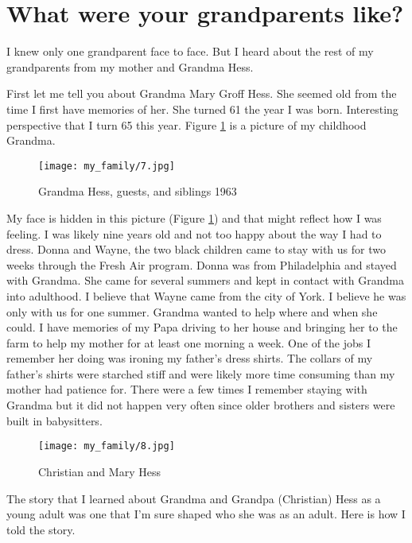 \section{What were your grandparents like?}
I knew only one grandparent face to face.
But I heard about the rest of my grandparents from my mother and Grandma Hess.

First let me tell you about Grandma Mary Groff Hess.
She seemed old from the time I first have memories of her.
She turned 61 the year I was born.
Interesting perspective that I turn 65 this year.
Figure \ref{grandma-hess} is a picture of my childhood Grandma.
\begin{figure}[h!]
\centering
\texttt{[image: my\_family/7.jpg]}
\caption{Grandma Hess, guests, and siblings 1963}
\label{grandma-hess}
\end{figure}

My face is hidden in this picture (Figure \ref{grandma-hess}) and that might reflect how I was feeling.
I was likely nine years old and not too happy about the way I had to dress.
Donna and Wayne, the two black children came to stay with us for two weeks through the Fresh Air program.
Donna was from Philadelphia and stayed with Grandma.
She came for several summers and kept in contact with Grandma into adulthood.
I believe that Wayne came from the city of York.
I believe he was only with us for one summer.
Grandma wanted to help where and when she could.
I have memories of my Papa driving to her house and bringing her to the farm to help my mother for at least one morning a week.
One of the jobs I remember her doing was ironing my father's dress shirts.
The collars of my father's shirts were starched stiff and were likely more time consuming than my mother had patience for.
There were a few times I remember staying with Grandma but it did not happen very often since older brothers and sisters were built in babysitters.

\begin{figure}
\centering
\texttt{[image: my\_family/8.jpg]}
\caption{Christian and Mary Hess}
\label{christian-mary-hess}
\end{figure}
The story that I learned about Grandma and Grandpa (Christian) Hess as a young adult was one that I'm sure shaped who she was as an adult. Here is how I told the story.

